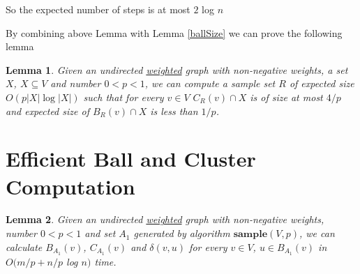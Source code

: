 \documentclass[shortabstract, lic, english]{iithesis}
\theoremstyle{definition} \newtheorem{definition}{Definition}[chapter]
\theoremstyle{plain} \newtheorem{remark}[definition]{Observation}
\theoremstyle{plain} \newtheorem{theorem}[definition]{Theorem}
\theoremstyle{plain} \newtheorem{lemma}[definition]{Lemma}
\theoremstyle{plain} \newtheorem{conjecture}[definition]{Conjecture}
\begin{document}
So the expected number of steps is at most $2$ log $n$

By combining above Lemma with Lemma \ref{ballSize} we can prove the following lemma

\begin{lemma} \label{sampleAlg}
    Given an undirected \underline{weighted} graph with non-negative weights, a set $X$, $X \subseteq V$ and number $0 < p < 1$, we can compute a sample set
    $R$ of expected size $O(p|X|\log|X|)$ such that for every $v \in V$ $C_R(v) \cap X$ is of size at most $4/p$ and expected size of $B_R(v) \cap X$ is less than $1/p$.
\end{lemma}


\section{Efficient Ball and Cluster Computation}

\begin{lemma} \label{ballClusterComputation}
    Given an undirected \underline{weighted} graph with non-negative weights, number $0 < p < 1$ and set $A_1$ generated by algorithm $\mathbf{sample}(V, p)$,
    we can calculate $B_{A_1}(v)$, $C_{A_1}(v)$ and $\delta(v,u)$ for every $v \in V$, $u \in B_{A_1}(v)$ in $O(m/p + n/p $ log $n )$ time.
\end{lemma}
\end{document}

